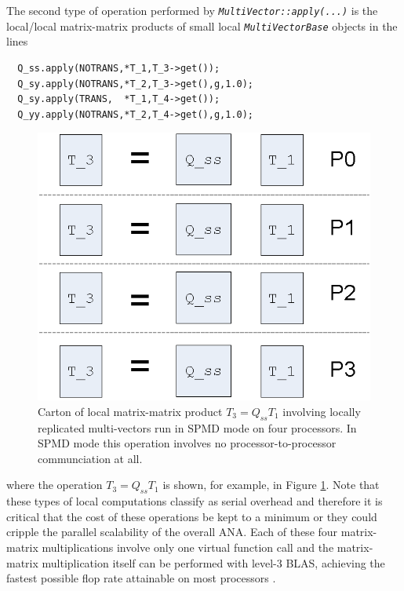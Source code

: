 \documentclass[pdf,ps2pdf,11pt]{SANDreport}
\begin{document}
The second type of operation performed by
{}\texttt{\textit{Multi\-Vector\-::apply(\-...)}} is the local/local
matrix-matrix products of small local
{}\texttt{\textit{Multi\-Vector\-Base}} objects in the lines

{\scriptsize\begin{verbatim}
  Q_ss.apply(NOTRANS,*T_1,T_3->get());
  Q_sy.apply(NOTRANS,*T_2,T_3->get(),g,1.0);
  Q_sy.apply(TRANS,  *T_1,T_4->get());
  Q_yy.apply(NOTRANS,*T_2,T_4->get(),g,1.0);
\end{verbatim}}

{\bsinglespace
\begin{figure}
\begin{center}
\includegraphics*[angle=0,scale=0.60]{SPMD_Local_Matrix_Matrix_Prod_P4}
\end{center}
\caption{
\label{tsfcore:fig:SPMD_Local_Matrix_Matrix_Prod_P4}
Carton of local matrix-matrix product $T_3 = Q_{ss} T_1$ involving
locally replicated multi-vectors run in SPMD mode on four processors.
In SPMD mode this operation involves no processor-to-processor
communciation at all.}
\end{figure}
\esinglespace}

{}\noindent{}where the operation $T_3 = Q_{ss} T_1$ is shown, for
example, in Figure
{}\ref{tsfcore:fig:SPMD_Local_Matrix_Matrix_Prod_P4}.  Note that these
types of local computations classify as serial overhead and therefore
it is critical that the cost of these operations be kept to a minimum
or they could cripple the parallel scalability of the overall ANA.
Each of these four matrix-matrix multiplications involve only one
virtual function call and the matrix-matrix multiplication itself can
be performed with level-3 BLAS, achieving the fastest possible flop
rate attainable on most processors {}\cite{ref:demmel_1997}.
\end{document}

